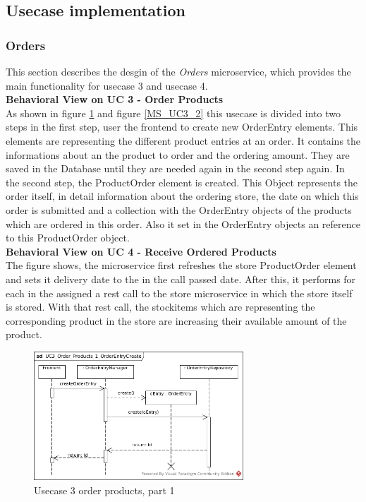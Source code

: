 	\subsection{Usecase implementation}\label{UsecaseSection}
	\FloatBarrier
		\subsubsection{Orders}
		This section describes the desgin of the \textit{Orders} microservice, which provides the main functionality for usecase 3 and usecase 4.\\
		
		\textbf{Behavioral View on UC 3 - Order Products} \\
		As shown in figure \ref{MS_UC3_1} and figure \ref{MS_UC3_2} this usecase is divided into two steps in the first step, user the frontend to create new OrderEntry elements. This elements are representing the different product entries at an order. It contains the informations about an the product to order and the ordering amount. They are saved in the Database until they are needed again in the second step again. 
		In the second step, the ProductOrder element is created. This Object represents the order itself, in detail information about the ordering store, the date on which this order is submitted and a collection with the OrderEntry objects of the products which are ordered in this order. Also it set in the OrderEntry objects an reference to this ProductOrder object.\\
		
		\textbf{Behavioral View on UC 4 - Receive Ordered Products} \\
		The figure 
		shows, the microservice first refreshes the store ProductOrder element and sets it delivery date to the in the call passed date.
		After this, it performs for each in the assigned a rest call to the store microservice in which the store itself is stored. With that rest call, the stockitems which are representing the corresponding product in the store are increasing their available amount of the product.
		
			\begin{figure}[!h]
				\centering
				\includegraphics[width = 0.7\textwidth]{img/UC3_Order_Products_1_OrderEntryCreate.jpg}
				\caption{Usecase 3 order products, part 1}
				\label{MS_UC3_1}
			\end{figure}
			

